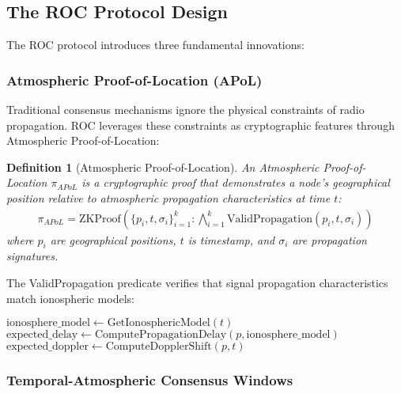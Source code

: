 \documentclass[11pt,a4paper]{article}
\newtheorem{definition}[theorem]{Definition}
\begin{document}
\subsection{The ROC Protocol Design}

The ROC protocol introduces three fundamental innovations:

\subsubsection{Atmospheric Proof-of-Location (APoL)}

Traditional consensus mechanisms ignore the physical constraints of radio propagation. ROC leverages these constraints as cryptographic features through Atmospheric Proof-of-Location:

\begin{definition}[Atmospheric Proof-of-Location]
An Atmospheric Proof-of-Location $\pi_{APoL}$ is a cryptographic proof that demonstrates a node's geographical position relative to atmospheric propagation characteristics at time $t$:
\begin{align}
\pi_{APoL} = \text{ZKProof}\left(\{p_i, t, \sigma_i\}_{i=1}^k : \bigwedge_{i=1}^k \text{ValidPropagation}(p_i, t, \sigma_i)\right)
\end{align}
where $p_i$ are geographical positions, $t$ is timestamp, and $\sigma_i$ are propagation signatures.
\end{definition}

The ValidPropagation predicate verifies that signal propagation characteristics match ionospheric models:

\begin{algorithm}[H]
\SetAlgoLined
{}
\caption{Atmospheric Propagation Validation}

$\text{ionosphere\_model} \leftarrow \text{GetIonosphericModel}(t)$\;
$\text{expected\_delay} \leftarrow \text{ComputePropagationDelay}(p, \text{ionosphere\_model})$\;
$\text{expected\_doppler} \leftarrow \text{ComputeDopplerShift}(p, t)$\;

\;
\end{algorithm}

\subsubsection{Temporal-Atmospheric Consensus Windows}
\end{document}
